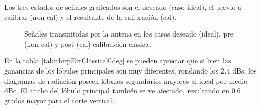 Los tres estados de señales graficados son el deseado (caso ideal), el previo a calibrar (non-cal) y el resultante de la
calibración (cal).
\begin{figure}[H]
	\centering

	\caption{Señales transmitidas por la antena en los casos deseado (ideal), pre (non-cal) y post (cal) calibración clásica.}
	\label{fig:chirpErrClassical0deg}
\end{figure}

En la tabla \ref{tab:chirpErrClassical0deg} se pueden apreciar que si bien las ganancias de los lóbulos principales son muy 
diferentes, rondando los 2.4 dBs, los diagramas de radiación poseen lóbulos segundarios mayores al ideal por medio dBc. El 
ancho del lóbulo principal también se ve afectado, resultando en 0.6 grados mayor para el corte vertical.

